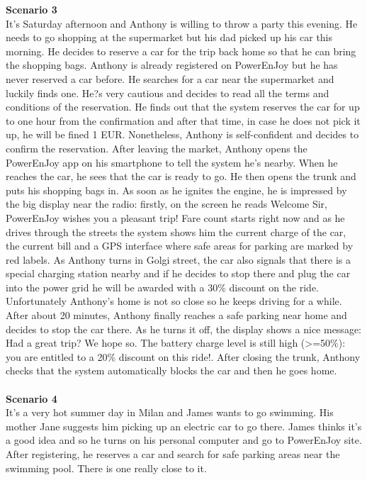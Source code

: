 \documentclass[11pt,a4paper]{report}
\begin{document}
\textbf{Scenario 3}\\
It's Saturday afternoon and Anthony is willing to throw a party this evening. He needs to go shopping at the supermarket but his dad picked up his car this morning. He decides to reserve a car for the trip back home so that he can bring the shopping bags. Anthony is already registered on PowerEnJoy but he has never reserved a car before. He searches for a car near the supermarket and luckily finds one. He?s very cautious and decides to read all the terms and conditions of the reservation. He finds out that the system reserves the car for up to one hour from the confirmation and after that time, in case he does not pick it up, he will be fined 1 EUR. Nonetheless, Anthony is self-confident and decides to confirm the reservation.
After leaving the market, Anthony opens the PowerEnJoy app on his smartphone to tell the system he's nearby. When he reaches the car, he sees that the car is ready to go. He then opens the trunk and puts his shopping bags in. As soon as he ignites the engine, he is impressed by the big display near the radio: firstly, on the screen he reads Welcome Sir, PowerEnJoy wishes you a pleasant trip! Fare count starts right now and as he drives through the streets the system shows him the current charge of the car, the current bill and a GPS interface where safe areas for parking are marked by red labels. As Anthony turns in Golgi street, the car also signals that there is a special charging station nearby and if he decides to stop there and plug the car into the power grid he will be awarded with a 30\% discount on the ride. Unfortunately Anthony's home is not so close so he keeps driving for a while.
After about 20 minutes, Anthony finally reaches a safe parking near home and decides to stop the car there. As he turns it off, the display shows a nice message: Had a great trip? We hope so. The battery charge level is still high (>=50\%): you are entitled to a 20\% discount on this ride!. After closing the trunk, Anthony checks that the system automatically blocks the car and then he goes home.\\ \noindent \\
\textbf{Scenario 4}\\
It's a very hot summer day in Milan and James wants to go swimming. His mother Jane suggests him picking up an electric car to go there. James thinks it's a good idea and so he turns on his personal computer and go to PowerEnJoy site. After registering, he reserves a car and search for safe parking areas near the swimming pool. There is one really close to it.
\end{document}
